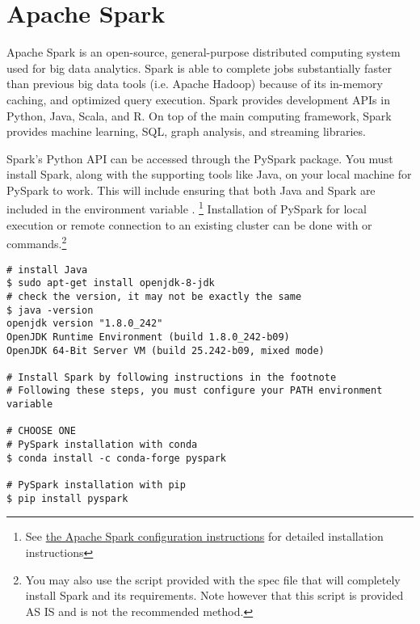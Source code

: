 

\section*{Apache Spark} %
Apache Spark is an open-source, general-purpose distributed computing system used for big data analytics.
Spark is able to complete jobs substantially faster than previous big data tools (i.e. Apache Hadoop) because of its in-memory caching, and optimized query execution.
Spark provides development APIs in Python, Java, Scala, and R.
On top of the main computing framework, Spark provides machine learning, SQL, graph analysis, and streaming libraries.

Spark's Python API can be accessed through the PySpark package.
You must install Spark, along with the supporting tools like Java, on your local machine for PySpark to work. 
This will include ensuring that both Java and Spark are included in the environment variable .
\footnote{See \href{https://spark.apache.org/docs/latest/}{the Apache Spark configuration instructions} for detailed installation instructions}
Installation of PySpark for local execution or remote connection to an existing cluster can be done with  or  commands.\footnote{You may also use the script provided with the spec file that will completely install Spark and its requirements. Note however that this script is provided AS IS and is not the recommended method.}

\begin{lstlisting}
# install Java
$ sudo apt-get install openjdk-8-jdk
# check the version, it may not be exactly the same
$ java -version
openjdk version "1.8.0_242"
OpenJDK Runtime Environment (build 1.8.0_242-b09)
OpenJDK 64-Bit Server VM (build 25.242-b09, mixed mode)

# Install Spark by following instructions in the footnote
# Following these steps, you must configure your PATH environment variable

# CHOOSE ONE
# PySpark installation with conda
$ conda install -c conda-forge pyspark

# PySpark installation with pip
$ pip install pyspark
\end{lstlisting}


